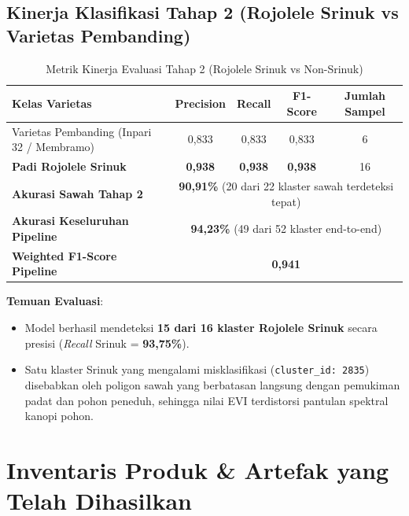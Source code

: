 \documentclass[11pt,a4paper]{article}
\begin{document}
\subsection{Kinerja Klasifikasi Tahap 2 (Rojolele Srinuk vs Varietas Pembanding)}
\begin{table}[H]
    \centering\small
    \caption{Metrik Kinerja Evaluasi Tahap 2 (Rojolele Srinuk vs Non-Srinuk)}
    \begin{tabularx}{\textwidth}{>{\raggedright\arraybackslash}Xcccc}
        \toprule
        \textbf{Kelas Varietas} & \textbf{Precision} & \textbf{Recall} & \textbf{F1-Score} & \textbf{Jumlah Sampel} \\
        \midrule
        Varietas Pembanding (Inpari 32 / Membramo) & 0,833 & 0,833 & 0,833 & 6 \\
        \textbf{Padi Rojolele Srinuk}              & \textbf{0,938} & \textbf{0,938} & \textbf{0,938} & 16 \\
        \midrule
        \textbf{Akurasi Sawah Tahap 2}       & \multicolumn{4}{c}{\textbf{90,91\%} (20 dari 22 klaster sawah terdeteksi tepat)} \\
        \textbf{Akurasi Keseluruhan Pipeline} & \multicolumn{4}{c}{\textbf{94,23\%} (49 dari 52 klaster end-to-end)} \\
        \textbf{Weighted F1-Score Pipeline}  & \multicolumn{4}{c}{\textbf{0,941}} \\
        \bottomrule
    \end{tabularx}
\end{table}

\noindent
\textbf{Temuan Evaluasi}:
\begin{itemize}
    \item Model berhasil mendeteksi \textbf{15 dari 16 klaster Rojolele Srinuk} secara presisi (\textit{Recall} Srinuk = \textbf{93,75\%}).
    \item Satu klaster Srinuk yang mengalami misklasifikasi (\texttt{cluster\_id: 2835}) disebabkan oleh poligon sawah yang berbatasan langsung dengan pemukiman padat dan pohon peneduh, sehingga nilai EVI terdistorsi pantulan spektral kanopi pohon.
\end{itemize}

\section{Inventaris Produk \& Artefak yang Telah Dihasilkan}
\end{document}
